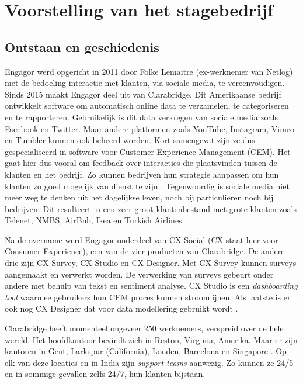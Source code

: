 \chapter{Voorstelling van het stagebedrijf}
\vspace{-3cm}
\section{Ontstaan en geschiedenis}
Engagor werd opgericht in 2011 door Folke Lemaitre (ex-werknemer van Netlog) met de bedoeling interactie met klanten, via sociale media, te vereenvoudigen. Sinds 2015 maakt Engagor deel uit van Clarabridge. Dit Amerikaanse bedrijf ontwikkelt software om automatisch online data te verzamelen, te categoriseren en te rapporteren. Gebruikelijk is dit data verkregen van sociale media zoals Facebook en Twitter. Maar andere platformen zoals YouTube, Instagram, Vimeo en Tumbler kunnen ook beheerd worden. Kort samengevat zijn ze dus gespecialiseerd in software voor Customer Experience Management (CEM). Het gaat hier dus vooral om feedback over interacties die plaatsvinden tussen de klanten en het bedrijf. Zo kunnen bedrijven hun strategie aanpassen om hun klanten zo goed mogelijk van dienst te zijn \cite{bp1}. Tegenwoordig is sociale media niet meer weg te denken uit het dagelijkse leven, noch bij particulieren noch bij bedrijven. Dit resulteert in een zeer groot klantenbestand met grote klanten zoals Telenet, NMBS, AirBnb, Ikea en Turkish Airlines.

Na de overname werd Engagor onderdeel van CX Social (CX staat hier voor Consumer Experience), een van de vier producten van Clarabridge. De andere drie zijn CX Survey, CX Studio en CX Designer. Met CX Survey kunnen surveys aangemaakt en verwerkt worden. De verwerking van surveys gebeurt onder andere met behulp van tekst en sentiment analyse. CX Studio is een \textit{dashboarding tool} waarmee gebruikers hun CEM proces kunnen stroomlijnen. Als laatste is er ook nog CX Designer dat voor data modellering gebruikt wordt \cite{Clarabridge.com}. 

Clarabridge heeft momenteel ongeveer 250 werknemers, verspreid over de hele wereld. Het hoofdkantoor bevindt zich in Reston, Virginia, Amerika. Maar er zijn kantoren in Gent, Larkspur (California), Londen, Barcelona en Singapore \cite{ClarabridgeOffices}. Op elk van deze locaties en in India zijn \textit{support teams} aanwezig. Zo kunnen ze 24/5 en in sommige gevallen zelfs 24/7, hun klanten bijstaan.


